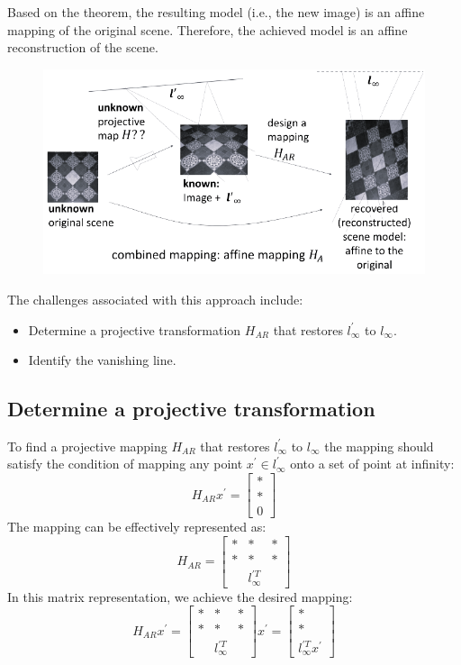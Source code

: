 \documentclass[12pt, a4paper]{report}
\begin{document}
    Based on the theorem, the resulting model (i.e., the new image) is an affine mapping of the original scene. 
    Therefore, the achieved model is an affine reconstruction of the scene.
    \begin{figure}[H]
        \centering
        \includegraphics[width=0.75\linewidth]{images/HAR.png}
    \end{figure}
    The challenges associated with this approach include:
    \begin{itemize}
        \item Determine a projective transformation $H_{AR}$ that restores $l^{'}_{\infty}$ to $l_{\infty}$.
        \item Identify the vanishing line.
    \end{itemize}
    
    \subsection{Determine a projective transformation}
    To find a projective mapping $H_{AR}$ that restores $l^{'}_{\infty}$ to $l_{\infty}$ the mapping should satisfy the condition of mapping any point $x^{'} \in l^{'}_{\infty}$ onto a set of point at infinity: 
    \[H_{AR}x^{'} = \begin{bmatrix} * \\ * \\ 0 \end{bmatrix}\]
    The mapping can be effectively represented as:
    \[H_{AR}=
    \begin{bmatrix}
        * & * & * \\
        * & * & * \\
        \: & l^{'T}_{\infty} & \:
    \end{bmatrix}\]
    In this matrix representation, we achieve the desired mapping: 
    \[H_{AR}x^{'}=
    \begin{bmatrix}
        * & * & * \\
        * & * & * \\
        \: & l^{'T}_{\infty} & \:
    \end{bmatrix}
    x^{'}
    =
    \begin{bmatrix}
        * \\
        * \\
        l^{'T}_{\infty}x^{'}
    \end{bmatrix}
    \]
\end{document}
